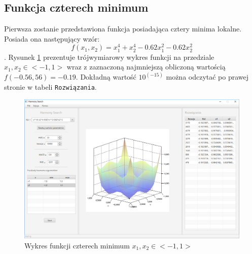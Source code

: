 \documentclass[10pt, a4paper]{article}
\begin{document}
\subsection{Funkcja czterech minimum}
\label{subsec:fcn4min}
Pierwsza zostanie przedstawiona funkcja posiadająca cztery minima lokalne. Posiada ona następujący wzór: $$f(x_{1},x_{2}) = x_{1}^{4}+x_{2}^{4}-0.62x_{1}^{2}-0.62x_{2}^{2} $$.  Rysunek \ref{fig:11} prezentuje trójwymiarowy wykres funkcji na przedziale $x_{1}, x_{2} \in <-1,1>$ wraz z zaznaczoną najmniejszą obliczoną wartością $f(-0.56,56)=-0.19$. Dokładną wartość $10^(-15)$ można odczytać po prawej stronie w tabeli {\tt Rozwiązania}. 
\begin{figure}[htbp]
	\centering
		\includegraphics[width=.9\textwidth]{images/11.PNG}
		\caption{Wykres funkcji czterech minimum $x_{1}, x_{2} \in <-1,1>$}
		\label{fig:11}
\end{figure}
\end{document}
